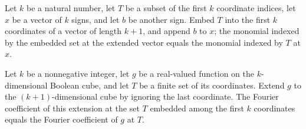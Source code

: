 \begin{theorem}
\label{FABL.monomial_map_castSucc_snoc}
\leanok
{}
Let $k$ be a natural number, let $T$ be a subset of the first $k$ coordinate indices,
let $x$ be a vector of $k$ signs, and let $b$ be another sign. Embed $T$ into the first
$k$ coordinates of a vector of length $k+1$, and append $b$ to $x$; the monomial indexed
by the embedded set at the extended vector equals the monomial indexed by $T$ at $x$.
\end{theorem}

\begin{theorem}
\label{FABL.fourierCoeff_lift_init}
\leanok
{}
Let $k$ be a nonnegative integer, let $g$ be a real-valued function on the
$k$-dimensional Boolean cube, and let $T$ be a finite set of its coordinates. Extend $g$
to the $(k+1)$-dimensional cube by ignoring the last coordinate. The Fourier coefficient
of this extension at the set $T$ embedded among the first $k$ coordinates equals the
Fourier coefficient of $g$ at $T$.
\end{theorem}

